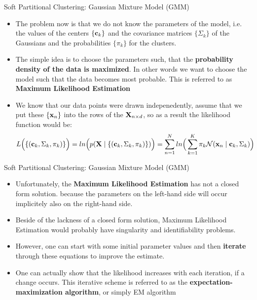 \documentclass[compress,oilve]{beamer}
\begin{document}
\begin{frame}{Soft Partitional Clustering: Gaussian Mixture Model (GMM)}
\begin{itemize}
\item The problem now is that we do not know the parameters of the model, i.e. the values of the centers $ \{ \mathbf{c_{\mathnormal k}} \} $ 
and the covariance matrices $\{ \Sigma_{k} \} $ of the Gaussians and the probabilities $\{\pi_{k}\}$ for the clusters.
\item The simple idea is to choose the parameters such, that the \textbf{probability density of the data is maximized}. In other words we want to choose the model such that the data becomes most probable. This is referred to as \textbf{Maximum Likelihood Estimation}
\item We know that our data points were drawn indepenedently, assume that we put these $\{\mathbf{x_{\mathnormal n}}\}$ into the rows of the $\mathbf{X_{\mathnormal n \times \mathnormal d}}$, so as a result the likelihood function would be:
$$ L\Big(\{ (\mathbf{c_{\mathnormal k}},  \Sigma_{k}, \pi_{k})\}\Big) =  ln\Big(p(\mathbf{X} \mid \{ (\mathbf{c_{\mathnormal k}},  \Sigma_{k}, \pi_{k})\})\Big) = \displaystyle\sum_{n=1}^{N}ln\Big(\displaystyle\sum_{k=1}^{K} \pi_{k} \mathcal{N}(\mathbf{x_{\mathnormal n}} \mid \mathbf{c_{\mathnormal k}}, \Sigma_{k})\Big)$$
\end{itemize}
\end{frame}

\begin{frame}{Soft Partitional Clustering: Gaussian Mixture Model (GMM)}
\begin{itemize}
\item Unfortunately, the \textbf{Maximum Likelihood Estimation} has not a closed form solution. because the parameters on the left-hand side will occur implicitely also on the right-hand side.
\item Beside of the lackness of a closed form solution, Maximum Likelihood Estimation would probably have singularity and identifiability problems. 
\item However, one can start with some initial parameter values and then \textbf{iterate} through these equations to improve the estimate.
\item One can actually show that the likelihood increases with each iteration, if a change occurs. This iterative scheme is referred to as the \textbf{expectation-maximization algorithm}, or simply EM algorithm
\end{itemize}
\end{frame}
\end{document}

